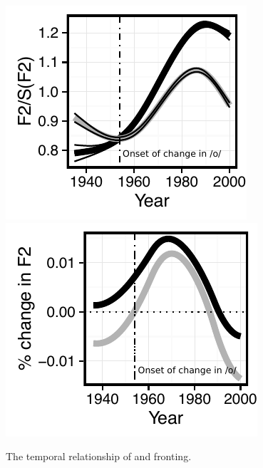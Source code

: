 \documentclass[12pt]{article}
\begin{document}
\vspace*{6pt}
\begin{figure}[H]
\centering
\includegraphics{owuwparalleltext.pdf}
\includegraphics{owuwparallelROCtext.pdf}
\caption{The temporal relationship of  and  fronting.}
\end{figure}
\vspace*{6pt}
\end{document}
